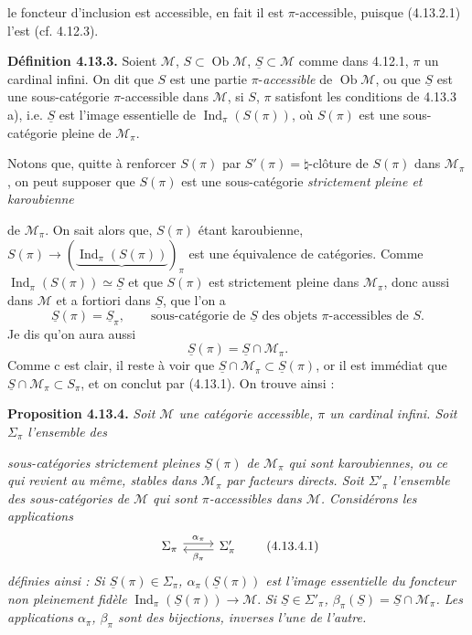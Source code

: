 \documentclass[11pt]{article}
\newcommand{\printedpage}[1]{\marginpar{\footnotesize p.~#1}}
\newcommand{\msp}[1]{\marginpar{\footnotesize [#1]}}
\newcommand{\M}{\mathcal{M}}
\newcommand{\Ind}{\operatorname{Ind}}
\newcommand{\Ob}{\operatorname{Ob}}
\newcommand{\uS}{\underline{S}}
\begin{document}
\msp{page 286}
 le foncteur d'inclusion est accessible, en fait il est $\pi$-accessible, puisque (4.13.2.1) l'est (cf. 4.12.3).

\textbf{Définition 4.13.3.} Soient $\M$, $S \subset \Ob\M$, $\uS \subset \M$ comme dans 4.12.1, $\pi$ un cardinal infini. On dit que $S$ est une partie $\pi$-\textit{accessible} de $\Ob\M$, ou que $\uS$ est une sous-catégorie $\pi$-accessible dans $\M$, si $S$, $\pi$ satisfont les conditions de 4.13.3 a), i.e. $\uS$ est l'image essentielle %
de $\Ind_\pi(S(\pi))$, où $S(\pi)$ est une sous-catégorie pleine de $\M_\pi$.

Notons que, quitte à renforcer $S(\pi)$ par $S'(\pi) = {\natural}$-clôture de $S(\pi)$ dans $\M_\pi$, on peut supposer que $S(\pi)$ est une sous-catégorie \textit{strictement pleine et karoubienne}

\msp{page 287}
de $\M_\pi$. On sait alors que, $S(\pi)$ étant karoubienne, $S(\pi) \longrightarrow (\underbrace{\Ind_\pi(S(\pi))}_{})_\pi$ est une équivalence de catégories. Comme $\Ind_\pi(S(\pi)) \simeq \uS$ et que $S(\pi)$ est strictement pleine dans $\M_\pi$, donc aussi dans $\M$ et a fortiori dans $\uS$, que l'on a
\[
\uS(\pi) = \uS_\pi , \qquad \text{sous-catégorie de } \uS \text{ des objets } \pi\text{-accessibles de } S. \tag*{(4.13.1)}
\]
Je dis qu'on aura aussi
\[
\uS(\pi) = \uS \cap \M_\pi . \tag*{(4.13.2)}
\]
Comme c est clair, il reste à voir que $\uS{\cap}\M_\pi \subset \uS(\pi)$, or il est immédiat que $\uS{\cap}\M_\pi \subset S_\pi$, %
et on conclut par (4.13.1). On trouve ainsi :

\textbf{Proposition 4.13.4.} \textit{Soit $\M$ une catégorie accessible, $\pi$ un cardinal infini. Soit $\Sigma_\pi$ l'ensemble des}

\msp{page 288}
\textit{sous-catégories strictement pleines $\uS(\pi)$ de $\M_\pi$ qui sont karoubiennes, ou ce qui revient au même, stables dans $\M_\pi$ par facteurs directs. Soit $\Sigma'_\pi$ l'ensemble des sous-catégories de}
\printedpage{107}
\textit{$\M$ qui sont $\pi$-accessibles dans $\M$. Considérons les applications}
\[
\begin{tikzcd}
\Sigma_\pi \arrow[r, shift left, "\alpha_\pi"] & \Sigma'_\pi \arrow[l, shift left, "\beta_\pi"]
\end{tikzcd}
\tag*{(4.13.4.1)}
\]
\textit{définies ainsi : Si $\uS(\pi) \in \Sigma_\pi$, $\alpha_\pi(\uS(\pi))$ est l'image essentielle du foncteur non pleinement fidèle} $\Ind_\pi(\uS(\pi)) \longrightarrow \M$. \textit{Si $\uS \in \Sigma'_\pi$, $\beta_\pi(\uS) = \uS \cap \M_\pi$. Les applications $\alpha_\pi$, $\beta_\pi$ sont des bijections, inverses l'une de l'autre.}
\end{document}
